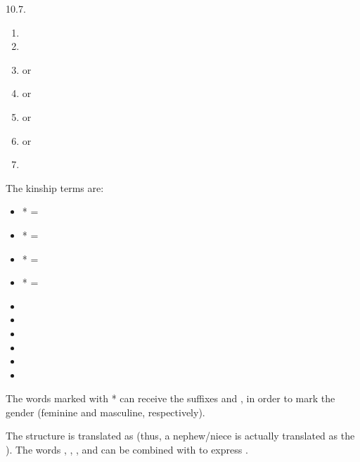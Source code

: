 \begin{refsection}
\begin{practiceproblemsolution}{10.7. \langnameTabaq}
\begin{solutions}[label=Solution 10.7\alph*]
\begin{enumerate}[label = \alph*.]
        \item {}
        \item {}
        \item {} or 
        \item {} or 
        \item {} or 
        \item {} or 
        \item {}
    \end{enumerate}
\end{solutions}


The kinship terms are:
\begin{multicols}{2}
    \begin{itemize}
        \item[] * = 
        \item[] * = 
        \item[] * = 
        \item[] * = 
        \item[] 
        \item[] 
        \item[] 
        \item[] 
        \item[] 
        \item[] 
    \end{itemize}
\end{multicols}

The words marked with * can receive the suffixes  and , in order to mark the gender (feminine and masculine, respectively).

The structure  is translated as  (thus, a nephew/niece is actually translated as the ). The words , , , and  can be combined with  to express .\\


\end{practiceproblemsolution}
\end{refsection}
